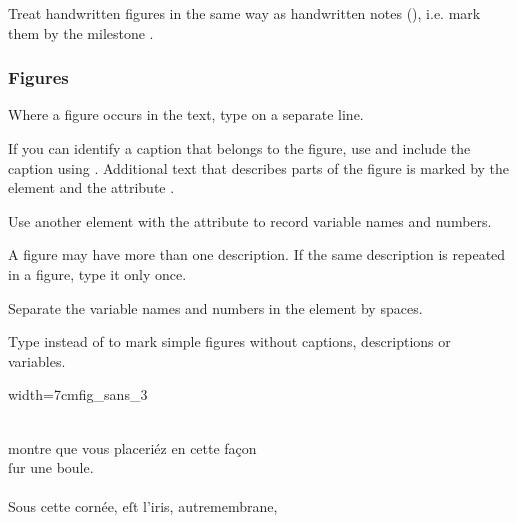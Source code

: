 \begin{note}
Treat handwritten figures in the same way as handwritten notes (), i.e.  mark them by the milestone .
\end{note}

\subsubsection{Figures}
\label{section figures}

\begin{mainrule}
  Where a figure occurs in the text, type  on a separate line.

  If you can identify a caption that belongs to the figure, use  and include the caption using . Additional text that describes parts of the figure is marked by the  element and the attribute .

  Use another  element with the attribute  to record variable names and numbers.
\end{mainrule}

\begin{clarification}
A figure may have more than one description.
If the same description is repeated in a figure, type it only once.

Separate the variable names and numbers in the  element by spaces.

Type  instead of  to mark simple figures without captions, descriptions or variables.
\end{clarification}



\vspace{2mm}
\begin{sampleImageSmall}{width=7cm}{fig_sans_3}
\begin{typeLatin}
 \someText \\
montre que vous placeriéz en cette façon  \\
ſur une boule. \\
 \\
Sous cette cornée, eſt l'iris, autre\lwr membrane,  \\
\someText {}
\end{typeLatin}
\end{sampleImageSmall}

